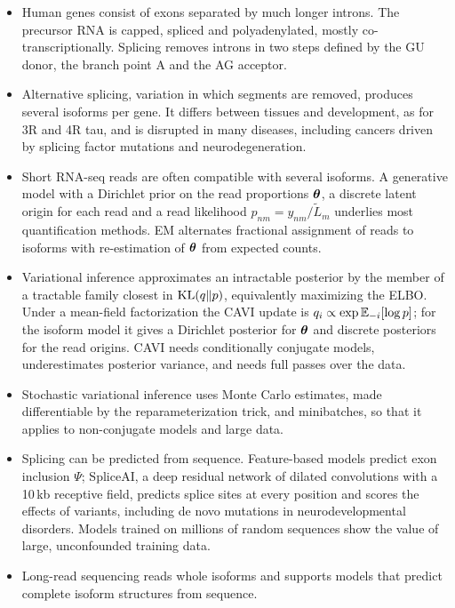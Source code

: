 \begin{itemize}
  \item Human genes consist of exons separated by much longer introns. The precursor RNA is capped, spliced and polyadenylated, mostly co-transcriptionally. Splicing removes introns in two steps defined by the GU donor, the branch point A and the AG acceptor.
  \item Alternative splicing, variation in which segments are removed, produces several isoforms per gene. It differs between tissues and development, as for 3R and 4R tau, and is disrupted in many diseases, including cancers driven by splicing factor mutations and neurodegeneration.
  \item Short RNA-seq reads are often compatible with several isoforms. A generative model with a Dirichlet prior on the read proportions $\boldsymbol{\theta}$, a discrete latent origin for each read and a read likelihood $p_{nm}=y_{nm}/\tilde L_m$ underlies most quantification methods. EM alternates fractional assignment of reads to isoforms with re-estimation of $\boldsymbol{\theta}$ from expected counts.
  \item Variational inference approximates an intractable posterior by the member of a tractable family closest in $\operatorname{KL}(q\|p)$, equivalently maximizing the ELBO. Under a mean-field factorization the CAVI update is $q_i\propto\exp\mathbb{E}_{-i}[\log p]$; for the isoform model it gives a Dirichlet posterior for $\boldsymbol{\theta}$ and discrete posteriors for the read origins. CAVI needs conditionally conjugate models, underestimates posterior variance, and needs full passes over the data.
  \item Stochastic variational inference uses Monte Carlo estimates, made differentiable by the reparameterization trick, and minibatches, so that it applies to non-conjugate models and large data.
  \item Splicing can be predicted from sequence. Feature-based models predict exon inclusion $\Psi$; SpliceAI, a deep residual network of dilated convolutions with a 10\,kb receptive field, predicts splice sites at every position and scores the effects of variants, including de novo mutations in neurodevelopmental disorders. Models trained on millions of random sequences show the value of large, unconfounded training data.
  \item Long-read sequencing reads whole isoforms and supports models that predict complete isoform structures from sequence.
\end{itemize}

